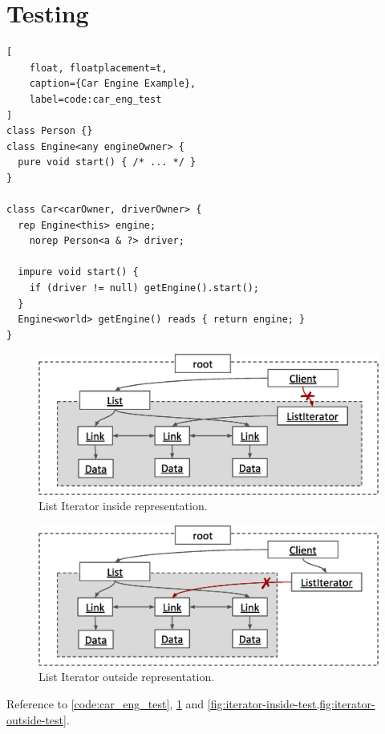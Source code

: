 \documentclass{acm_proc_article-sp}
\begin{document}
\section{Testing}
\label{sec:test}

\begin{lstlisting}[
	float, floatplacement=t,
	caption={Car Engine Example},
	label=code:car_eng_test
]
class Person {}
class Engine<any engineOwner> {
  pure void start() { /* ... */ }
}

class Car<carOwner, driverOwner> {
  rep Engine<this> engine;
	norep Person<a & ?> driver;
    
  impure void start() {
    if (driver != null) getEngine().start();
  }
  Engine<world> getEngine() reads { return engine; }
}
\end{lstlisting}

\begin{figure}[t]
\centering
\includegraphics{iterator-fail-inside.eps}
\caption{List Iterator inside representation.}
\label{fig:iterator-inside-test}
\end{figure}

\begin{figure}[t]
\centering
\includegraphics{iterator-fail-outside.eps}
\caption{List Iterator outside representation.}
\label{fig:iterator-outside-test}
\end{figure}

Reference to \cref{code:car_eng_test}, \cref{sec:test} and 
\cref{fig:iterator-inside-test,fig:iterator-outside-test}.
\end{document}
